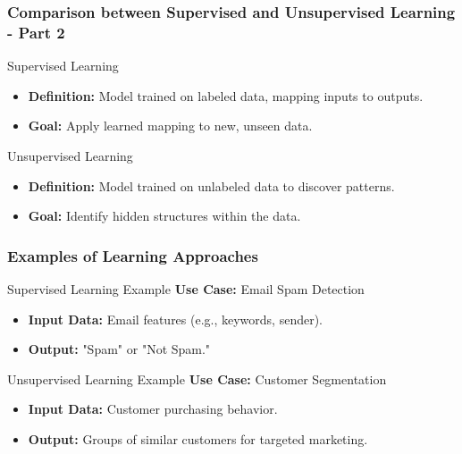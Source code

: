 \documentclass[aspectratio=169]{beamer}
\begin{document}
\begin{frame}[fragile]
    \frametitle{Comparison between Supervised and Unsupervised Learning - Part 2}
    
    \begin{block}{Supervised Learning}
        \begin{itemize}
            \item \textbf{Definition:} Model trained on labeled data, mapping inputs to outputs.
            \item \textbf{Goal:} Apply learned mapping to new, unseen data.
        \end{itemize}
    \end{block}

    \begin{block}{Unsupervised Learning}
        \begin{itemize}
            \item \textbf{Definition:} Model trained on unlabeled data to discover patterns.
            \item \textbf{Goal:} Identify hidden structures within the data.
        \end{itemize}
    \end{block}
\end{frame}

\begin{frame}[fragile]
    \frametitle{Examples of Learning Approaches}
    \begin{block}{Supervised Learning Example}
        \textbf{Use Case:} Email Spam Detection
        \begin{itemize}
            \item \textbf{Input Data:} Email features (e.g., keywords, sender).
            \item \textbf{Output:} "Spam" or "Not Spam."
        \end{itemize}
    \end{block}

    \begin{block}{Unsupervised Learning Example}
        \textbf{Use Case:} Customer Segmentation
        \begin{itemize}
            \item \textbf{Input Data:} Customer purchasing behavior.
            \item \textbf{Output:} Groups of similar customers for targeted marketing.
        \end{itemize}
    \end{block}
\end{frame}
\end{document}
